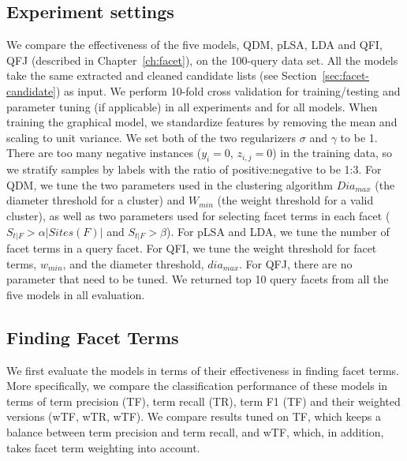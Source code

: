 \subsection{Experiment settings}
We compare the effectiveness of the five models, QDM, pLSA, LDA and QFI, QFJ (described in Chapter~\ref{ch:facet}), on the 100-query data set.
All the models take the same extracted and cleaned candidate lists (see Section~\ref{sec:facet-candidate}) as input.
We perform 10-fold cross validation for training/testing and parameter tuning (if applicable) in all experiments and for all models.
When training the graphical model, we standardize features by removing the mean and scaling to unit variance. 
We set both of the two regularizers $\sigma$ and $\gamma$ to be 1.
There are too many negative instances ($y_i=0$, $z_{i,j}=0$) in the training data, so we stratify samples by labels with the ratio of positive:negative to be 1:3.
For QDM, we tune the two parameters used in the clustering algorithm $Dia_{max}$ (the diameter threshold for a cluster) and $W_{min}$ (the weight threshold for a valid cluster), as well as two parameters used for selecting facet terms in each facet ($S_{t|F} > \alpha |Sites(F)|$ and $S_{t|F}>\beta$).
For pLSA and LDA, we tune the number of facet terms in a query facet.
For QFI, we tune the weight threshold for facet terms, $w_{min}$, and the diameter threshold,  $dia_{max}$.
For QFJ, there are no parameter that need to be tuned.
We returned top 10 query facets from all the five models in all evaluation. 
\subsection{Finding Facet Terms}
\label{sec:expt}
We first evaluate the models in terms of their effectiveness in finding facet terms. More specifically, we compare the classification performance of these models in terms of term precision (TF), term recall (TR), term F1 (TF) and their weighted versions (wTF, wTR, wTF). We compare results tuned on TF, which keeps a balance between term precision and term recall, and wTF, which, in addition, takes facet term weighting into account.


